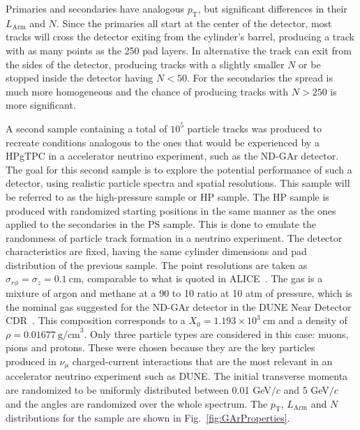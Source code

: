 Primaries and secondaries have analogous $p_{\textrm{T}}$, but significant differences in their $L_{\textrm{Arm}}$ and $N$. Since the primaries all start at the center of the detector, most tracks will cross the detector exiting from the cylinder's barrel, producing a track with as many points as the 250 pad layers. In alternative the track can exit from the sides of the detector, producing tracks with a slightly smaller $N$ or be stopped inside the detector having $N<50$. For the secondaries the spread is much more homogeneous and the chance of producing tracks with $N>250$ is more significant.

A second sample containing a total of $10^5$ particle tracks was produced to recreate conditions analogous to the ones that would be experienced by a HPgTPC in a accelerator neutrino experiment, such as the ND-GAr detector. The goal for this second sample is to explore the potential performance of such a detector, using realistic particle spectra and spatial resolutions. This sample will be referred to as the high-pressure sample or HP sample. The HP sample is produced with randomized starting positions in the same manner as the ones applied to the secondaries in the PS sample. This is done to emulate the randomness of particle track formation in a neutrino experiment. The detector characteristics are fixed, having the same cylinder dimensions and pad distribution of the previous sample. The point resolutions are taken as $\sigma_{r\phi}=\sigma_z=0.1 \ \text{cm}$, comparable to what is quoted in ALICE~\cite{LIPPMANN2012}. The gas is a mixture of argon and methane at a 90 to 10 ratio at 10 atm of pressure, which is the nominal gas suggested for the ND-GAr detector in the DUNE Near Detector CDR~\cite{DUNE:2021NDCDR}. This composition corresponds to a $X_0=1.193 \times 10^3 \ \text{cm}$ and a density of $\rho = 0.01677 \ \text{g/cm}^3$. Only three particle types are considered in this case: muons, pions and protons. These were chosen because they are the key particles produced in $\nu_\mu$ charged-current interactions that are the most relevant in an accelerator neutrino experiment such as DUNE. The initial transverse momenta are randomized to be uniformly distributed between 0.01 GeV$/c$ and 5 GeV$/c$ and the angles are randomized  over the whole spectrum. The $p_{\text{T}}$, $L_\textrm{Arm}$ and $N$ distributions for the sample are shown in Fig.~\ref{fig:GArProperties}. %

